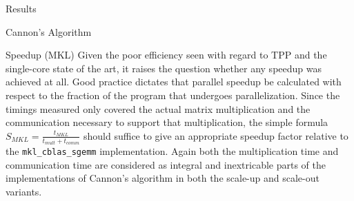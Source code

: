 \documentclass{article}
\begin{document}
\begin{section}{Results}
\begin{subsection}{Cannon's Algorithm}
\begin{paragraph}{}
    \end{paragraph}
    \begin{paragraph}{Speedup (MKL)}
      Given the poor efficiency seen with regard to TPP and the single-core state of the art, it raises the question whether any speedup was achieved at all.
      Good practice dictates that parallel speedup be calculated with respect to the fraction of the program that undergoes parallelization. Since the timings
      measured only covered the actual matrix multiplication and the communication necessary to support that multiplication, the simple formula
      $S_{MKL} = \frac{t_{MKL}}{t_{mult}+t_{comm}}$ should suffice to give an appropriate speedup factor relative to the \texttt{mkl\_cblas\_sgemm} implementation.
      Again both the multiplication time and communication time are considered as integral and inextricable parts of the implementations of Cannon's algorithm
      in both the scale-up and scale-out variants.
    \end{paragraph}
    \begin{paragraph}{}

\end{paragraph}
\end{subsection}
\end{section}
\end{document}
